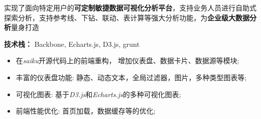 \documentclass{resume}
\begin{document}
\begin{onehalfspacing}
实现了面向特定用户的\textbf{可定制敏捷数据可视化分析平台}，支持业务人员进行自助式探索分析，支持参考线、下钻、联动、表计算等强大分析功能，为\textbf{企业级大数据分析}量身打造


\textbf{技术栈：} Backbone, Echarts.js, D3.js, grunt
\begin{itemize}
  \item 在\textit{saiku}开源代码上的前端重构， 增加仪表盘、数据卡片、数据源等模块;
  \item 丰富的仪表盘功能: 静态、动态文本，全局过滤器，图片，多种类型图表等;
  \item 可视化图表: 基于\textit{D3.js}和\textit{Echarts.js}的多种可视化图表;
  \item 前端性能优化: 首页加载，数据缓存等的优化;
\end{itemize}
\end{onehalfspacing}




\end{document}
